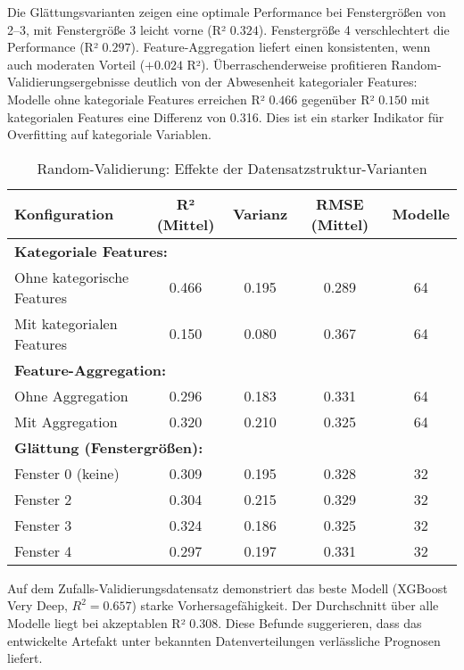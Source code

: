 Die Glättungsvarianten zeigen eine optimale Performance bei Fenstergrößen von 2–3, mit Fenstergröße 3 leicht vorne (R² $0.324$). Fenstergröße 4 verschlechtert die Performance (R² $0.297$). Feature-Aggregation liefert einen konsistenten, wenn auch moderaten Vorteil ($+0.024$ R²). Überraschenderweise profitieren Random-Validierungsergebnisse deutlich von der Abwesenheit kategorialer Features: Modelle ohne kategoriale Features erreichen R² $0.466$ gegenüber R² $0.150$ mit kategorialen Features eine Differenz von 0.316. Dies ist ein starker Indikator für Overfitting auf kategoriale Variablen.

\begin{table}[H]
  \centering
  \begin{tabular}{lcccc}
    \toprule
    \textbf{Konfiguration} & \textbf{R² (Mittel)} & \textbf{Varianz} & \textbf{RMSE (Mittel)} & \textbf{Modelle} \\
    \midrule
    \multicolumn{5}{l}{\textbf{Kategoriale Features:}} \\
    Ohne kategorische Features & 0.466 & 0.195 & 0.289 & 64 \\
    Mit kategorialen Features & 0.150 & 0.080 & 0.367 & 64 \\
    \midrule
    \multicolumn{5}{l}{\textbf{Feature-Aggregation:}} \\
    Ohne Aggregation & 0.296 & 0.183 & 0.331 & 64 \\
    Mit Aggregation & 0.320 & 0.210 & 0.325 & 64 \\
    \midrule
    \multicolumn{5}{l}{\textbf{Glättung (Fenstergrößen):}} \\
    Fenster 0 (keine) & 0.309 & 0.195 & 0.328 & 32 \\
    Fenster 2 & 0.304 & 0.215 & 0.329 & 32 \\
    Fenster 3 & 0.324 & 0.186 & 0.325 & 32 \\
    Fenster 4 & 0.297 & 0.197 & 0.331 & 32 \\
    \bottomrule
  \end{tabular}
  \caption{Random-Validierung: Effekte der Datensatzstruktur-Varianten}
  \label{tab:structure_random}
\end{table}

Auf dem Zufalls-Validierungsdatensatz demonstriert das beste Modell (XGBoost Very Deep, $R^2 = 0.657$) starke Vorhersagefähigkeit. Der Durchschnitt über alle Modelle liegt bei akzeptablen R² $0.308$. Diese Befunde suggerieren, dass das entwickelte Artefakt unter bekannten Datenverteilungen verlässliche Prognosen liefert.

